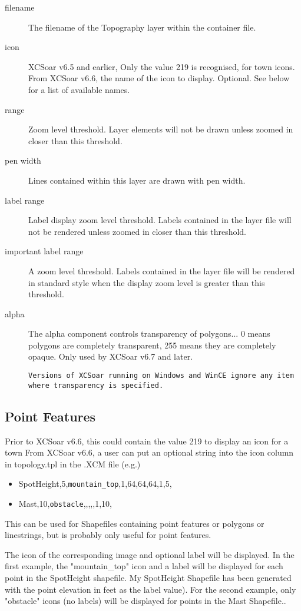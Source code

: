\begin{description}
\item[filename] The filename of the Topography layer within the container file.
\item[icon] XCSoar v6.5 and earlier, Only the value 219 is recognised, for town icons.
From XCSoar v6.6, the name of the icon to display. Optional. See below for a list of available names.
\item[range] Zoom level threshold. Layer elements will not be drawn unless zoomed in closer than this threshold.
\item[pen width] Lines contained within this layer are drawn with pen width.
\item[label range] Label display zoom level threshold. Labels contained in the layer file
will not be rendered unless zoomed in closer than this threshold.
\item[important label range] A zoom level threshold. Labels contained in the layer file will be
rendered in standard style when the display zoom level is greater than this threshold.
\item[alpha] The alpha component controls transparency of polygons...
0 means polygons are completely transparent, 255 means they are completely opaque.
Only used by XCSoar v6.7 and later.

\texttt{Versions of XCSoar running on Windows and WinCE ignore any item where transparency is specified.}

\end{description}
\subsection{Point Features}
Prior to XCSoar v6.6, this could contain the value 219 to display an icon for a town
From XCSoar v6.6, a user can put an optional string into the icon column in topology.tpl in the .XCM file (e.g.)
\begin{itemize}
\item SpotHeight,5,\texttt{mountain\_top},1,64,64,64,1,5,
\item Mast,10,\texttt{obstacle},,,,,1,10,
\end{itemize}
This can be used for Shapefiles containing point features or polygons or linestrings, but is probably only useful for point features.

The icon of the corresponding image and optional label will be displayed. In the first example, 
the "mountain\_top" icon and a label will be displayed for each point in the SpotHeight shapefile. My
SpotHeight Shapefile has been generated with the point elevation in feet as the label value). For the second example, only "obstacle" icons 
(no labels) will be displayed for points in the Mast Shapefile..

